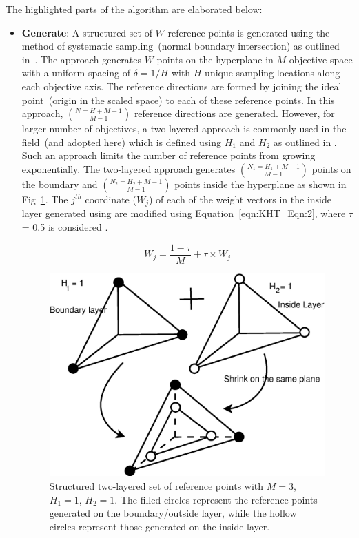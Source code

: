\documentclass{sig-alternate}
\begin{document}
The highlighted parts of the algorithm are elaborated below:\\
\begin{itemize}
	\item \textbf{Generate}: A structured set of $W$ reference points is generated using the method of systematic sampling~(normal boundary intersection) as outlined in~\cite{das1998normal}. The approach generates $W$ points on the hyperplane in $M$-objcetive space with a uniform spacing of $\delta=1/H$ with $H$ unique sampling locations along each objective axis. The reference directions are formed by joining the ideal point~(origin in the scaled space) to each of these reference points. In this approach, $N = {H+M-1}\choose{M-1}$ reference directions are generated. However, for larger number of objectives, a two-layered approach is commonly used in the field~(and adopted here) which is defined using $H_1$ and $H_2$ as outlined in \cite{Li2015dominance}. Such an approach limits the number of reference points from growing exponentially. The two-layered approach generates $N_1 = {H_1+M-1}\choose{M-1}$ points on the boundary and $N_2 = {H_2+M-1}\choose{M-1}$ points inside the hyperplane as shown in Fig~\ref{fig:KHT_Fig:1}. The $j^{th}$ coordinate ($W_j$) of each of the weight vectors in the inside layer generated using \cite{das1998normal} are modified using Equation~\ref{eqn:KHT_Eqn:2}, where $\tau$ = 0.5 is considered \cite{Li2015dominance}.
	
	\begin{equation}
	W_j = \frac{1-\tau}{M} + \tau \times W_j
	\label{eqn:KHT_Eqn:2} 
	\end{equation} 
	
	\begin{figure}[!htb]
		\centering
		\includegraphics[width=.4\textwidth]{Figures/fig1.eps}
		\caption{Structured two-layered set of reference points with $M=3$, $H_1=1$, $H_2=1$. The filled circles represent the reference points generated on the boundary/outside layer, while the hollow circles represent those generated on the inside layer.}
		\label{fig:KHT_Fig:1}
	\end{figure}
	

\end{itemize}
\end{document}

